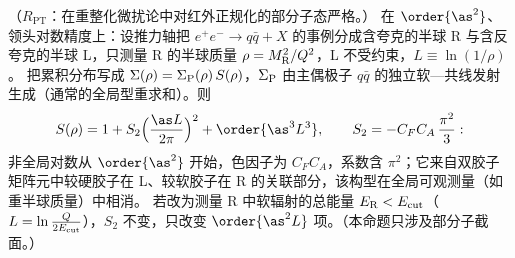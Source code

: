 \begin{proposition}\label{prop:jets-ngl}
（$R_{\mathrm{PT}}$：在重整化微扰论中对红外正规化的部分子态严格。）
在 $\order{\as^2}$、领头对数精度上：设推力轴把 $e^+e^-\to q\bar q+X$ 的事例分成含夸克的半球 R 与含反夸克的半球 L，只测量 R 的半球质量 $\rho=M_{\rm R}^2/Q^2$，L 不受约束，$L\equiv\ln(1/\rho)$。
把累积分布写成 $\Sigma(\rho)=\Sigma_{\rm P}(\rho)\,S(\rho)$，$\Sigma_{\rm P}$ 由主偶极子 $q\bar q$ 的独立软—共线发射生成（通常的全局型重求和）。则
\begin{equation}\label{eq:jets-S2}
S(\rho)=1+S_2\Big(\frac{\as L}{2\pi}\Big)^2+\order{\as^3L^3},\qquad S_2=-C_FC_A\,\frac{\pi^2}{3}:
\end{equation}
非全局对数从 $\order{\as^2}$ 开始，色因子为 $C_FC_A$，系数含 $\pi^2$；它来自双胶子矩阵元中较硬胶子在 L、较软胶子在 R 的关联部分，该构型在全局可观测量（如重半球质量）中相消。
若改为测量 R 中软辐射的总能量 $E_{\rm R}<E_{\rm cut}$（$L=\ln\frac{Q}{2E_{\rm cut}}$），$S_2$ 不变，只改变 $\order{\as^2L}$ 项。（本命题只涉及部分子截面。）
\end{proposition}

